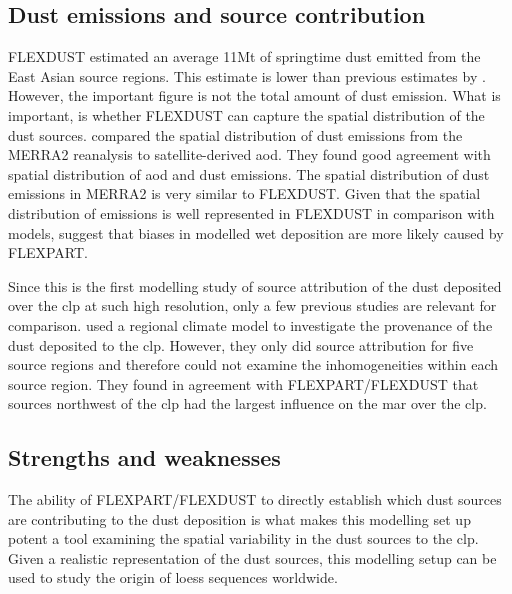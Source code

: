 \subsection{Dust emissions and source contribution}
FLEXDUST estimated an average 11Mt of springtime dust emitted from the East Asian source regions. This estimate is lower than previous estimates by \textcite{xuan2004identification}. 
However, the important figure is not the total amount of dust emission. What is important, is whether FLEXDUST can capture the spatial distribution of the dust sources. \textcite{liu2018influence} compared the spatial distribution of dust emissions from the MERRA2 reanalysis to satellite-derived \acrfull{aod}. They found good agreement with spatial distribution of \acrshort{aod} and dust emissions. The spatial distribution of dust emissions in MERRA2 is very similar to FLEXDUST. Given that the spatial distribution of emissions is well represented in FLEXDUST in comparison with models, suggest that biases in modelled wet deposition are more likely caused by FLEXPART. 

Since this is the first modelling study of source attribution of the dust deposited over the \acrshort{clp} at such high resolution, only a few previous studies are relevant for comparison. \textcite{shi2011distinguishing} used a regional climate model to investigate the provenance of the dust deposited to the \acrshort{clp}. 
However, they only did source attribution for five source regions and therefore could not examine the inhomogeneities within each source region.
They found in agreement with FLEXPART/FLEXDUST that sources northwest of the \acrshort{clp} had the largest influence on the \acrshort{mar} over the \acrshort{clp}. 

\subsection{Strengths and weaknesses}\label{sec:model_advantages}
The ability of FLEXPART/FLEXDUST to directly establish which dust sources  are contributing to the dust deposition is what makes this modelling set up potent a tool examining the spatial variability in the dust sources to the \acrshort{clp}. Given a realistic representation of the dust sources, this modelling setup can be used to study the origin of loess sequences worldwide. 

